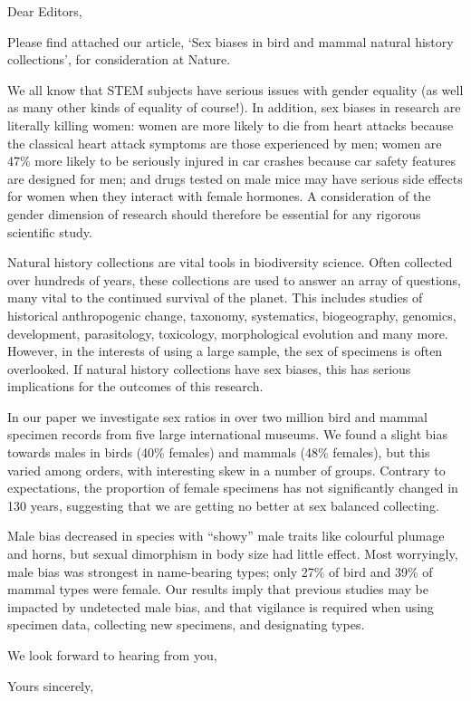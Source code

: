 \documentclass[11pt]{letter}
\begin{document}
\begin{letter}{}
\opening{Dear Editors,}

Please find attached our article, `Sex biases in bird and mammal natural history collections', for consideration at Nature.

We all know that STEM subjects have serious issues with gender equality (as well as many other kinds of equality of course!). In addition, sex biases in research are literally killing women: women are more likely to die from heart attacks because the classical heart attack symptoms are those experienced by men; women are 47\% more likely to be seriously injured in car crashes because car safety features are designed for men; and drugs tested on male mice may have serious side effects for women when they interact with female hormones. A consideration of the gender dimension of research should therefore be essential for any rigorous scientific study.

Natural history collections are vital tools in biodiversity science. Often collected over hundreds of years, these collections are used to answer an array of questions, many vital to the continued survival of the planet. This includes studies of historical anthropogenic change, taxonomy, systematics, biogeography, genomics, development, parasitology, toxicology, morphological evolution and many more. However, in the interests of using a large sample, the sex of specimens is often overlooked. If natural history collections have sex biases, this has serious implications for the outcomes of this research.

In our paper we investigate sex ratios in over two million bird and mammal specimen records from five large international museums. We found a slight bias towards males in birds (40\% females) and mammals (48\% females), but this varied among orders, with interesting skew in a number of groups. Contrary to expectations, the proportion of female specimens has not significantly changed in 130 years, suggesting that we are getting no better at sex balanced collecting.

Male bias decreased in species with ``showy'' male traits like colourful plumage and horns, but  sexual dimorphism in body size had little effect. Most worryingly, male bias was strongest in name-bearing types; only 27\% of bird and 39\% of mammal types were female. Our results imply that previous studies may be impacted by undetected male bias, and that vigilance is required when using specimen data, collecting new specimens, and designating types. 
 
We look forward to hearing from you,


\closing{Yours sincerely,}


\end{letter}
\end{document}
